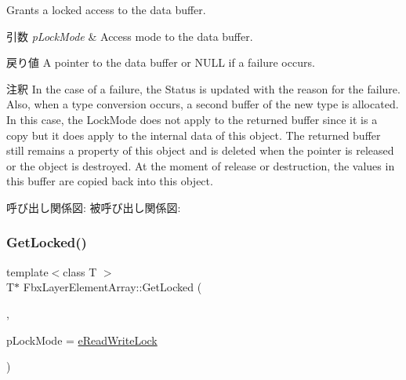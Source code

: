 Grants a locked access to the data buffer. 
\begin{DoxyParams}{引数}
{\em p\+Lock\+Mode} & Access mode to the data buffer. \\
\hline
\end{DoxyParams}
\begin{DoxyReturn}{戻り値}
A pointer to the data buffer or N\+U\+LL if a failure occurs. 
\end{DoxyReturn}
\begin{DoxyRemark}{注釈}
In the case of a failure, the Status is updated with the reason for the failure. Also, when a type conversion occurs, a second buffer of the new type is allocated. In this case, the Lock\+Mode does not apply to the returned buffer since it is a copy but it does apply to the internal data of this object. The returned buffer still remains a property of this object and is deleted when the pointer is released or the object is destroyed. At the moment of release or destruction, the values in this buffer are copied back into this object. 
\end{DoxyRemark}
呼び出し関係図\+:
被呼び出し関係図\+:
\mbox{\label{class_fbx_layer_element_array_a30fa9915279366bc14c76fd656b42d61}} 
\subsubsection{\texorpdfstring{Get\+Locked()}{GetLocked()}\hspace{0.1cm}{\footnotesize\ttfamily [3/3]}}
{\footnotesize\ttfamily template$<$class T $>$ \\
T$\ast$ Fbx\+Layer\+Element\+Array\+::\+Get\+Locked (\begin{DoxyParamCaption}\item[{T $\ast$}]{,  }\item[{\hyperlink{class_fbx_layer_element_array_a8968b1fb337f924d0e9ca87302b54d70}{E\+Lock\+Mode}}]{p\+Lock\+Mode = {\ttfamily \hyperlink{class_fbx_layer_element_array_a8968b1fb337f924d0e9ca87302b54d70afb510a1a3f85e5a4294bd956f5f936f9}{e\+Read\+Write\+Lock}} }\end{DoxyParamCaption})}

